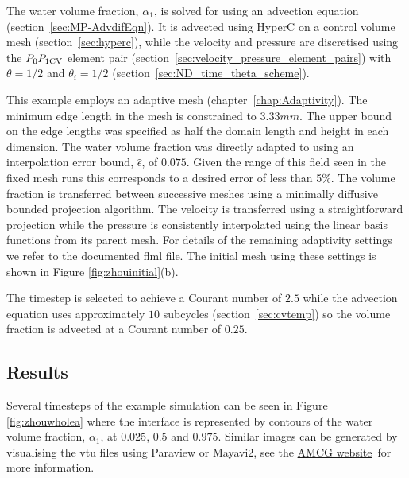 The water volume fraction, $\alpha_1$, is solved for using an advection equation (section~\ref{sec:MP-AdvdifEqn}).  It is advected
using HyperC on a control volume mesh (section~\ref{sec:hyperc}), while the velocity and pressure are discretised using the
$P_0P_{1\mathrm{CV}}$ element pair (section~\ref{sec:velocity_pressure_element_pairs}) with $\theta=1/2$ and $\theta_i=1/2$ (section~\ref{sec:ND_time_theta_scheme}).  

This example employs an adaptive mesh (chapter~\ref{chap:Adaptivity}). The minimum edge length in the mesh is constrained to $3.33mm$. The upper bound on the edge lengths was specified as half the domain length and height in each dimension.  The water volume fraction was directly adapted to using an interpolation error bound, $\hat{\epsilon}$, of $0.075$. Given the range of this field seen in the fixed mesh runs this corresponds to a desired error of less than 5\%. The volume fraction is transferred between successive meshes using a minimally diffusive bounded projection algorithm.  The velocity is transferred using a straightforward projection while the pressure is consistently interpolated using the linear basis functions from its parent mesh. For details of the remaining adaptivity settings we refer to the documented flml file.  The initial mesh using these settings is shown in Figure \ref{fig:zhouinitial}(b). 

The timestep is selected to achieve a Courant number of $2.5$ while the advection equation uses approximately $10$ subcycles
(section~\ref{sec:cvtemp}) so the volume fraction is advected at a Courant number of $0.25$.  

\subsection{Results}
Several timesteps of the example simulation can be seen in Figure \ref{fig:zhouwholea} where the interface is represented by
contours of the water volume fraction, $\alpha_1$, at $0.025$, $0.5$ and $0.975$.  Similar images can be generated by visualising
the vtu files using Paraview or Mayavi2, see the \href{http://amcg-www.ese.ic.ac.uk/}{AMCG website}\ for more information.

